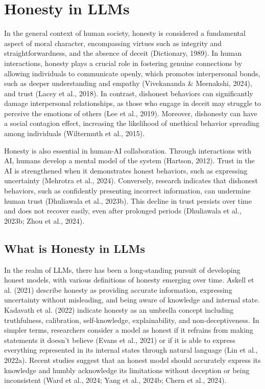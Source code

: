 \section{Honesty in LLMs}
\label{sec:honesty}

In the general context of human society, honesty is considered a fundamental aspect of moral character, encompassing virtues such as integrity and straightforwardness, and the absence of deceit (Dictionary, 1989). In human interactions, honesty plays a crucial role in fostering genuine connections by allowing individuals to communicate openly, which promotes interpersonal bonds, such as deeper understanding and empathy (Vivekananda \& Meenakshi, 2024), and trust (Lacey et al., 2018). In contrast, dishonest behaviors can significantly damage interpersonal relationships, as those who engage in deceit may struggle to perceive the emotions of others (Lee et al., 2019). Moreover, dishonesty can have a social contagion effect, increasing the likelihood of unethical behavior spreading among individuals (Wiltermuth et al., 2015).

Honesty is also essential in human-AI collaboration. Through interactions with AI, humans develop a mental model of the system (Hartson, 2012). Trust in the AI is strengthened when it demonstrates honest behaviors, such as expressing uncertainty (Mehrotra et al., 2024). Conversely, research indicates that dishonest behaviors, such as confidently presenting incorrect information, can undermine human trust (Dhuliawala et al., 2023b). This decline in trust persists over time and does not recover easily, even after prolonged periods (Dhuliawala et al., 2023b; Zhou et al., 2024).

\subsection{What is Honesty in LLMs}
\label{sec:what_honesty}

In the realm of LLMs, there has been a long-standing pursuit of developing honest models, with various definitions of honesty emerging over time. Askell et al. (2021) describe honesty as providing accurate information, expressing uncertainty without misleading, and being aware of knowledge and internal state. Kadavath et al. (2022) indicate honesty as an umbrella concept including truthfulness, calibration, self-knowledge, explainability, and non-deceptiveness. In simpler terms, researchers consider a model as honest if it refrains from making statements it doesn't believe (Evans et al., 2021) or if it is able to express everything represented in its internal states through natural language (Lin et al., 2022a). Recent studies suggest that an honest model should accurately express its knowledge and humbly acknowledge its limitations without deception or being inconsistent (Ward et al., 2024; Yang et al., 2024b; Chern et al., 2024).

